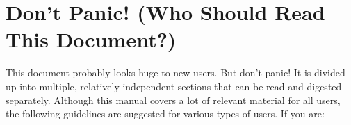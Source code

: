 %
% 
%
%

\chapter{Don't Panic! (Who Should Read This Document?)}

This document probably looks huge to new users.  But don't panic!  It
is divided up into multiple, relatively independent sections that can
be read and digested separately.  Although this manual covers a lot of
relevant material for all users, the following guidelines are
suggested for various types of users.  If you are:


